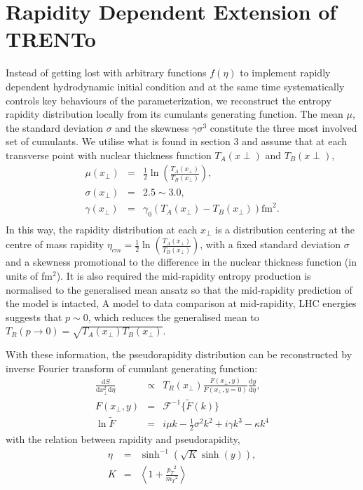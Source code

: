 \documentclass[10pt,a4paper, twocolumn]{article}
\begin{document}
\section{Rapidity Dependent Extension of TRENTo}
	Instead of getting lost with arbitrary functions $f(\eta)$ to implement rapidly dependent hydrodynamic initial condition and at the same time systematically controls key behaviours of the parameterization, we reconstruct the entropy rapidity distribution locally from its cumulants generating function. 
	The mean $\mu$, the standard deviation $\sigma$ and the skewness $\gamma\sigma^3$ constitute the three most involved set of cumulants. 
	We utilise what is found in section 3 and assume that at each transverse point with nuclear thickness function $T_A(x{\perp})$ and $T_B(x{\perp})$,
	\begin{eqnarray}
		\mu(x_\perp) &=& \frac{1}{2}\ln(\frac{T_A(x_\perp)}{T_B(x_\perp)}), \\
		\sigma(x_\perp) &=& 2.5 \sim 3.0, \\
		\gamma(x_\perp) &=& \gamma_0 (T_A(x_\perp) - T_B(x_\perp)) \mathrm{fm}^2. \\
	\end{eqnarray}
	In this way, the rapidity distribution at each $x_\perp$ is a distribution centering at the centre of mass rapidity $\eta_{cm} =  \frac{1}{2}\ln(\frac{T_A(x_\perp)}{T_B(x_\perp)})$, with a fixed standard deviation $\sigma$ and a skewness promotional to the difference in the nuclear thickness function (in units of fm${}^2$).
	It is also required the mid-rapidity entropy production is normalised to the generalised mean ansatz so that the mid-rapidity prediction of the model is intacted,
	A model to data comparison at mid-rapidity, LHC energies suggests that $p \sim 0$, which reduces the generalised mean to $T_R (p \rightarrow 0) = \sqrt{ T_A(x_\perp) T_B(x_\perp) }$.
	
	With these information, the pseudorapidity distribution can be reconstructed by inverse Fourier transform of cumulant generating function:
	\begin{eqnarray}
		\frac{\mathrm{d}S}{\mathrm{d}x_{\perp}^2 \mathrm{d}\eta}  &\propto& T_R(x_\perp) \frac{F(x_\perp,y)}{F(x_\perp,y = 0)}\frac{\mathrm{d}y}{\mathrm{d}\eta}, \\
	 	F(x_\perp,y) &=& \mathcal{F}^{-1}\{\tilde{F}(k)\} \\
	 	\ln \tilde{F} &=&  i \mu k - \frac{1}{2}\sigma^2 k^2 + i 	\gamma k^3  - \kappa k^4
	\end{eqnarray}
	with the relation between rapidity and pseudorapidity,
	\begin{eqnarray}
		\eta &=& \sinh^{-1}(\sqrt{K}\sinh(y)),\\ 
		K &=& \left< 1+ \frac{{p_T}^2}{{m_T}^2} \right>
	\end{eqnarray}
	
\end{document}
